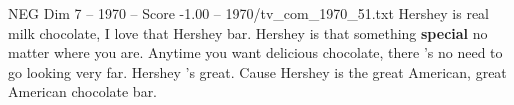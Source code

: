 \begin{textsample}{NEG Dim 7 – 1970 – Score -1.00 – 1970/tv\_com\_1970\_51.txt}  \label{ex:f7_neg_062}
Hershey is real milk chocolate, I love that Hershey bar.
Hershey is that something \textbf{special} no matter where you are.
Anytime you want delicious chocolate, there 's no need to go looking very far.
Hershey 's great.
Cause Hershey is the great American, great American chocolate bar.

\end{textsample}
